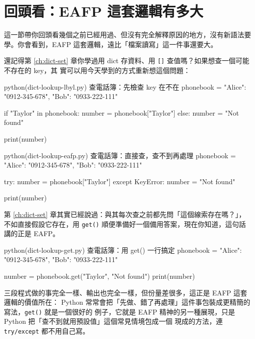 \section{回頭看：EAFP 這套邏輯有多大}
\label{sec:eafp-recap}

這一節帶你回頭看幾個之前已經用過、但沒有完全解釋原因的地方，沒有新語法要學。你會看到，EAFP
這套邏輯，遠比「檔案讀寫」這一件事還要大。

還記得第 \ref{ch:dict-set} 章你學過用 dict 存資料、用 \texttt{[]} 查值嗎？如果想查一個可能不存在的 key，其
實可以用今天學到的方式重新想這個問題：

\begin{example}{python}{(dict-lookup-lbyl.py) 查電話簿：先檢查 key 在不在}
phonebook = {"Alice": "0912-345-678", "Bob": "0933-222-111"}

if "Taylor" in phonebook:
    number = phonebook["Taylor"]
else:
    number = "Not found"

print(number)
\end{example}


\begin{example}{python}{(dict-lookup-eafp.py) 查電話簿：直接查，查不到再處理}
phonebook = {"Alice": "0912-345-678", "Bob": "0933-222-111"}

try:
    number = phonebook["Taylor"]
except KeyError:
    number = "Not found"

print(number)
\end{example}


第 \ref{ch:dict-set} 章其實已經說過：與其每次查之前都先問「這個線索存在嗎？」，不如直接假設它存在，用
\texttt{get()} 順便準備好一個備用答案，現在你知道，這句話講的正是 EAFP。

\begin{example}{python}{(dict-lookup-get.py) 查電話簿：用 get() 一行搞定}
phonebook = {"Alice": "0912-345-678", "Bob": "0933-222-111"}

number = phonebook.get("Taylor", "Not found")
print(number)
\end{example}


三段程式做的事完全一樣、輸出也完全一樣，但份量差很多，這正是 EAFP 這套邏輯的價值所在：
Python 常常會把「先做、錯了再處理」這件事包裝成更精簡的寫法，\texttt{get()} 就是一個很好的
例子，它就是 EAFP 精神的另一種展現，只是 Python 把「查不到就用預設值」這個常見情境包成一個
現成的方法，連 \texttt{try/except} 都不用自己寫。

